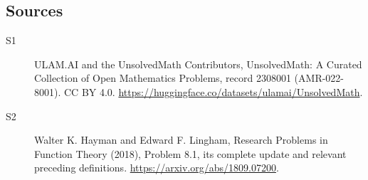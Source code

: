 \documentclass[11pt]{article}
\begin{document}
\subsection{Sources}
\begin{description}
\item[\hypertarget{source:2308001:1}{S1}] ULAM.AI and the UnsolvedMath Contributors, UnsolvedMath: A Curated Collection of Open Mathematics Problems, record 2308001 (AMR-022-8001). CC BY 4.0. \url{https://huggingface.co/datasets/ulamai/UnsolvedMath}.
\item[\hypertarget{source:2308001:2}{S2}] Walter K. Hayman and Edward F. Lingham, Research Problems in Function Theory (2018), Problem 8.1, its complete update and relevant preceding definitions. \url{https://arxiv.org/abs/1809.07200}.
\end{description}
\label{end:2308001}
\end{document}
